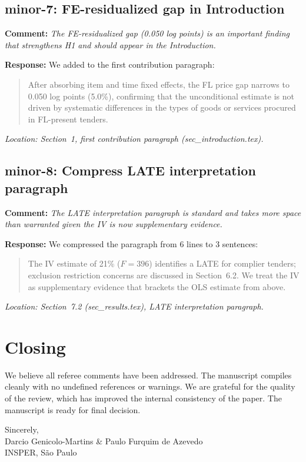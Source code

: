 \documentclass[12pt]{article}
\newcommand{\referee}[1]{\medskip\noindent\textbf{Comment:} \textit{#1}\medskip}
\newcommand{\response}[1]{\noindent\textbf{Response:} #1}
\begin{document}
\subsection*{minor-7: FE-residualized gap in Introduction}

\referee{The FE-residualized gap (0.050 log points) is an important
finding that strengthens H1 and should appear in the Introduction.}

\response{We added to the first contribution paragraph:}

\begin{quote}
After absorbing item and time fixed effects, the FL price gap narrows to
0.050 log points (5.0\%), confirming that the unconditional estimate is
not driven by systematic differences in the types of goods or services
procured in FL-present tenders.
\end{quote}

\noindent\textit{Location: Section~1, first contribution paragraph
(sec\_introduction.tex).}

\subsection*{minor-8: Compress LATE interpretation paragraph}

\referee{The LATE interpretation paragraph is standard and takes more
space than warranted given the IV is now supplementary evidence.}

\response{We compressed the paragraph from 6 lines to 3 sentences:}

\begin{quote}
The IV estimate of 21\% ($F = 396$) identifies a LATE for complier
tenders; exclusion restriction concerns are discussed in Section~6.2. We
treat the IV as supplementary evidence that brackets the OLS estimate
from above.
\end{quote}

\noindent\textit{Location: Section~7.2 (sec\_results.tex), LATE
interpretation paragraph.}

\bigskip
\bigskip

\section*{Closing}

We believe all referee comments have been addressed. The manuscript
compiles cleanly with no undefined references or warnings. We are
grateful for the quality of the review, which has improved the internal
consistency of the paper. The manuscript is ready for final decision.

\bigskip
\noindent Sincerely,\\
Darcio Genicolo-Martins \& Paulo Furquim de Azevedo\\
INSPER, S\~ao Paulo
\end{document}
